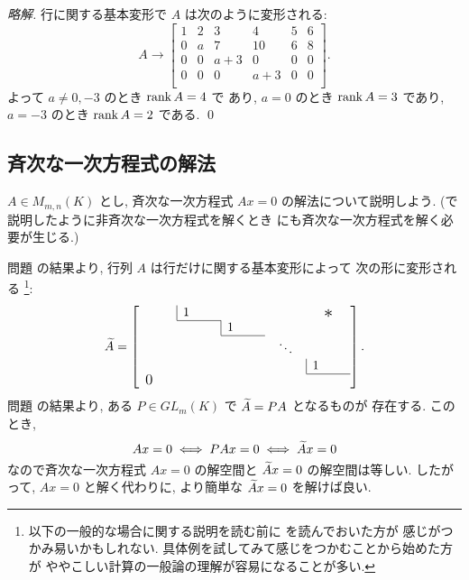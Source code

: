 \documentclass[12pt,twoside]{jarticle}
\newcommand\commentout[1]{#1}
\newcommand\commentout[1]{}
\begin{document}
\commentout{
\begin{proof}[略解]
  行に関する基本変形で $A$ は次のように変形される:
  \begin{equation*}
    A \to
    \begin{bmatrix}
      1 & 2 &  3  &  4  & 5 & 6 \\
      0 & a &  7  & 10  & 6 & 8 \\
      0 & 0 & a+3 &  0  & 0 & 0 \\
      0 & 0 &  0  & a+3 & 0 & 0 \\
    \end{bmatrix}.
  \end{equation*}
  よって $a\ne 0,-3$ のとき $\mathop{\mathrm{rank}}\nolimits A=4$ で
  あり, $a=0$ のとき $\mathop{\mathrm{rank}}\nolimits A=3$ であり, $a=-3$ のとき $\mathop{\mathrm{rank}}\nolimits A=2$ である.
  \qed
\end{proof}
}


\subsection{斉次な一次方程式の解法}
\label{sec:sol-hom-lin-eq}

$A\in M_{m,n}(K)$ とし, 斉次な一次方程式 $Ax=0$ の解法について説明しよう. 
(で説明したように非斉次な一次方程式を解くとき
にも斉次な一次方程式を解く必要が生じる.)

問題  の結果より, 行列 $A$ は行だけに関する基本変形によって
次の形に変形される%
\footnote{以下の一般的な場合に関する説明を読む前に
  を読んでおいた方が
  感じがつかみ易いかもしれない.  
  具体例を試してみて感じをつかむことから始めた方が
  ややこしい計算の一般論の理解が容易になることが多い.}:
\begin{equation*}
  \tA = 
  \left[
    \begin{array}{ccccc}
      \multicolumn{1}{c|}{\qquad} & 1 \qquad & & & \bigstaru \\
      \cline{2-2}
      \multicolumn{2}{c|}{} & 1 \qquad & & \\
      \cline{3-3}
      \multicolumn{3}{c}{} & \;\;\ddots\;\; & \\
      \multicolumn{4}{c|}{} & 1 \qquad \\
      \cline{5-5}
      \multicolumn{5}{l}{\bigzerol} \\
    \end{array}
  \right]. 
\end{equation*}
問題  の結果より, ある $P\in GL_m(K)$ で ${\widetilde A}=PA$ となるものが
存在する. このとき, 
\begin{equation*}
  Ax = 0 \iff PAx = 0 \iff {\widetilde A} x = 0
\end{equation*}
なので斉次な一次方程式 $Ax=0$ の解空間と ${\widetilde A} x=0$ の解空間は等しい.
したがって, $Ax=0$ と解く代わりに, より簡単な ${\widetilde A} x=0$ を解けば良い.
\end{document}
